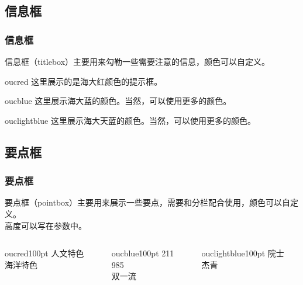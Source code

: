 \documentclass[aspectratio=169,UTF8,t]{beamer}%
\begin{document}
\subsection{信息框}

\begin{frame}
    \frametitle{信息框}
    信息框（titlebox）主要用来勾勒一些需要注意的信息，颜色可以自定义。
    \begin{titlebox}[提示框]{oucred}
        这里展示的是海大红颜色的提示框。
      \end{titlebox}
      \begin{titlebox}[颜色展示]{oucblue}
        这里展示海大蓝的颜色。当然，可以使用更多的颜色。 
      \end{titlebox}
      \begin{titlebox}[另外一些颜色的显示]{ouclightblue}
        这里展示海大天蓝的颜色。当然，可以使用更多的颜色。 
      \end{titlebox}    
\end{frame}

\subsection{要点框}

\begin{frame}
    \frametitle{要点框}
    要点框（pointbox）主要用来展示一些要点，需要和分栏配合使用，颜色可以自定义。 \\   
    高度可以写在参数中。  
      \begin{columns}
        \begin{column}{0.3\textwidth}
            \begin{pointbox}[要点一]{oucred}{100pt}
                人文特色\\
                海洋特色\\                
            \end{pointbox}
        \end{column}
        \begin{column}{0.3\textwidth}
            \begin{pointbox}[要点二]{oucblue}{100pt}
                211\\
                985\\
                双一流 
            \end{pointbox}            
        \end{column}
        \begin{column}{0.3\textwidth}
            \begin{pointbox}[要点三]{ouclightblue}{100pt}
                院士\\
                杰青 
            \end{pointbox}
        \end{column}
    \end{columns}    
\end{frame}
\end{document}
